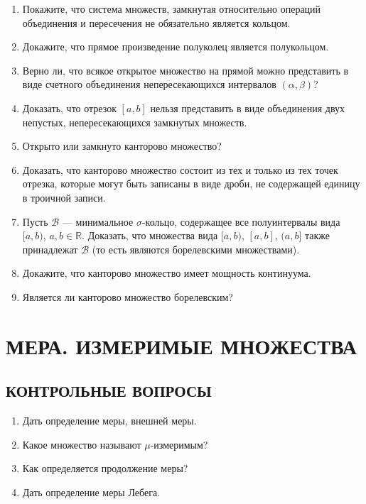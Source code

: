 \documentclass[12pt,a4paper]{article}
\begin{document}
\begin{enumerate}
\item Покажите, что система множеств, замкнутая относительно операций объединения и пересечения не обязательно является кольцом.
\item Докажите, что прямое произведение полуколец является полукольцом.
\item Верно ли, что всякое открытое множество на прямой можно представить в виде счетного объединения непересекающихся интервалов $(\alpha, \beta)$?
\item Доказать, что отрезок $[a, b]$ нельзя представить в виде объединения двух непустых, непересекающихся замкнутых множеств.
\item Открыто или замкнуто канторово множество?
\item Доказать, что канторово множество состоит из тех и только из тех точек отрезка, которые могут быть записаны в виде дроби, не содержащей единицу в троичной записи.
\item Пусть $\mathcal{B}$ — минимальное $\sigma$-кольцо, содержащее все полуинтервалы вида $[a, b)$, $a, b \in \mathbb{R}$. Доказать, что множества вида $[a, b)$, $[a, b]$, $(a, b]$ также принадлежат $\mathcal{B}$ (то есть являются борелевскими множествами).
\item Докажите, что канторово множество имеет мощность континуума.
\item Является ли канторово множество борелевским?
\end{enumerate}

\section{МЕРА. ИЗМЕРИМЫЕ МНОЖЕСТВА}

\subsection*{КОНТРОЛЬНЫЕ ВОПРОСЫ}
\begin{enumerate}
\item Дать определение меры, внешней меры.
\item Какое множество называют $\mu$-измеримым?
\item Как определяется продолжение меры?
\item Дать определение меры Лебега.
\end{enumerate}
\end{document}
